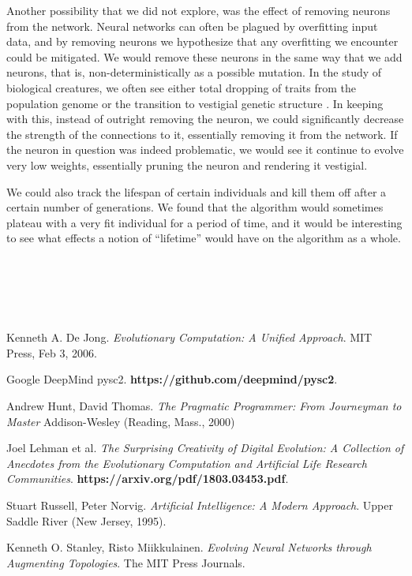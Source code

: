 \documentclass{article}
\begin{document}
Another possibility that we did not explore, was the effect of removing neurons
from the network. Neural networks can often be plagued by overfitting input
data, and by removing neurons we hypothesize that any overfitting we encounter
could be mitigated. We would remove these neurons in the same way that we add
neurons, that is, non-deterministically as a possible mutation. In the study of
biological creatures, we often see either total dropping of traits from the
population genome or the transition to vestigial genetic structure
\cite{lehman}. In keeping with this, instead of outright removing the neuron, we
could significantly decrease the strength of the connections to it, essentially
removing it from the network. If the neuron in question was indeed problematic,
we would see it continue to evolve very low weights, essentially pruning the
neuron and rendering it vestigial.

We could also track the lifespan of certain individuals and kill them off after
a certain number of generations. We found that the algorithm would sometimes
plateau with a very fit individual for a period of time, and it would be
interesting to see what effects a notion of ``lifetime'' would have on the
algorithm as a whole.


\\~\\
\hline
\\~\\

\begin{thebibliography}{9}

  Kenneth A. De Jong.
  \textit{Evolutionary Computation: A Unified Approach}.
  MIT Press, Feb 3, 2006.

  Google DeepMind pysc2.
  \textbf{https://github.com/deepmind/pysc2}.

  Andrew Hunt, David Thomas.
  \textit{The Pragmatic Programmer: From Journeyman to Master}
  Addison-Wesley (Reading, Mass., 2000)

  Joel Lehman et al.
  \textit{The Surprising Creativity of Digital Evolution: A Collection of
    Anecdotes from the Evolutionary Computation and Artificial Life Research
    Communities}.
  \textbf{https://arxiv.org/pdf/1803.03453.pdf}.

  Stuart Russell, Peter Norvig.
  \textit{Artificial Intelligence: A Modern Approach}.
  Upper Saddle River (New Jersey, 1995).
  
  Kenneth O. Stanley, Risto Miikkulainen.
  \textit{Evolving Neural Networks through Augmenting Topologies}. 
  The MIT Press Journals.




\end{thebibliography}
\end{document}
